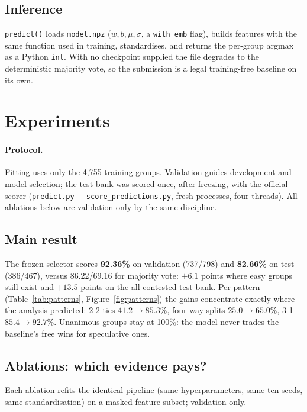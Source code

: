 \documentclass[10pt,a4paper]{article}
\begin{document}
\subsection{Inference}
\texttt{predict()} loads \texttt{model.npz} ($w,b,\mu,\sigma$, a
\texttt{with\_emb} flag), builds features with the same function used in
training, standardises, and returns the per-group argmax as a Python
\texttt{int}. With no checkpoint supplied the file degrades to the
deterministic majority vote, so the submission is a legal training-free
baseline on its own.

\section{Experiments}
\label{sec:experiments}

\paragraph{Protocol.} Fitting uses only the 4{,}755 training groups.
Validation guides development and model selection; the test bank was scored
once, after freezing, with the official scorer
(\texttt{predict.py} + \texttt{score\_predictions.py}, fresh processes, four
threads). All ablations below are validation-only by the same discipline.

\subsection{Main result}
The frozen selector scores \textbf{92.36\%} on validation (737/798) and
\textbf{82.66\%} on test (386/467), versus 86.22/69.16 for majority vote:
$+6.1$ points where easy groups still exist and $+13.5$ points on the
all-contested test bank. Per pattern (Table~\ref{tab:patterns},
Figure~\ref{fig:patterns}) the gains concentrate exactly where the analysis
predicted: 2-2 ties $41.2\to85.3\%$, four-way splits $25.0\to65.0\%$, 3-1
$85.4\to92.7\%$. Unanimous groups stay at 100\%: the model never trades the
baseline's free wins for speculative ones.

\subsection{Ablations: which evidence pays?}
\label{sec:ablations}

Each ablation refits the identical pipeline (same hyperparameters, same ten
seeds, same standardisation) on a masked feature subset; validation only.
\end{document}
